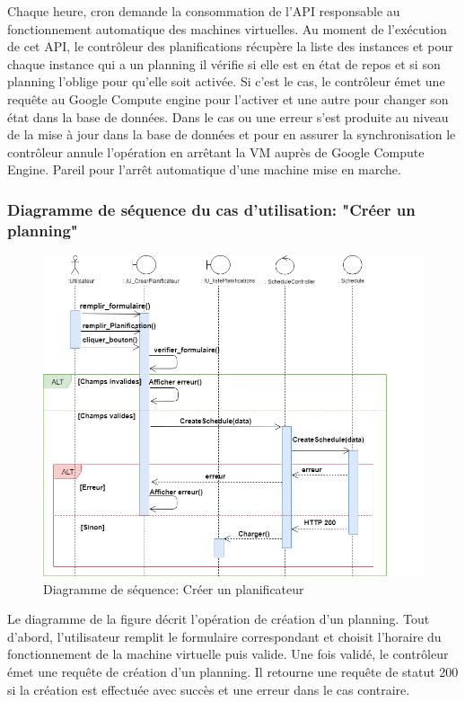 Chaque heure, cron demande la consommation de l'API responsable au fonctionnement  automatique des machines virtuelles. Au moment de l'exécution de cet API, le contrôleur des planifications récupère la liste des instances et pour chaque instance qui a un planning il vérifie  si elle est en état de repos et si son planning l'oblige pour qu'elle soit activée. Si c'est le cas,  le contrôleur émet une requête au Google Compute engine  pour l'activer et une  autre pour changer son état  dans la base de données. Dans le cas ou une erreur s'est produite au niveau de la mise à jour dans la base de données et pour en assurer la synchronisation le contrôleur annule l'opération en arrêtant la VM auprès de Google Compute Engine. 
Pareil pour l'arrêt automatique d'une machine mise en marche.
\subsubsection{Diagramme de séquence du cas d'utilisation: "Créer un planning"}

\begin{figure}[H]
	\centering
	\includegraphics[scale=0.6]{createSchedule.png}
	\caption{Diagramme de séquence: Créer un planificateur}
	\label{Diagramme de séquence: Créer un planificateur}
\end{figure}
Le diagramme de la figure décrit l'opération de création d'un planning. Tout d'abord, l'utilisateur remplit le formulaire correspondant et choisit l'horaire du fonctionnement de  la machine virtuelle puis valide. Une fois validé, le contrôleur émet une requête de création d'un planning. Il retourne une requête de statut 200 si la création est effectuée avec succès et une erreur dans le cas contraire.
